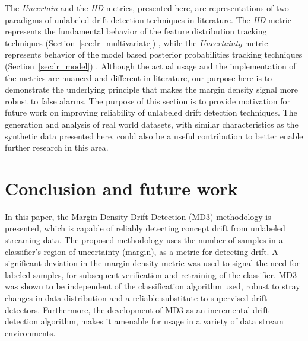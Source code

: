 \documentclass[authoryear,3p,times,twocolumn]{elsarticle}
\begin{document}
The \textit{Uncertain} and the \textit{HD} metrics, presented here, are representations of two paradigms of unlabeled drift detection techniques in literature. The \textit{HD} metric represents the fundamental behavior of the feature distribution tracking techniques (Section~\ref{sec:lr_multivariate}) \citep{lee2012detection,ditzler2011hellinger, kuncheva2014pca,qahtan2015pca}, while the \textit{Uncertainty} metric represents behavior of the model based posterior probabilities tracking techniques (Section~\ref{sec:lr_model}) \citep{dries2009adaptive,lindstrom2013drift,dredze2010we,zliobaite2010change}
. Although the actual usage and the implementation of the metrics are nuanced and different in literature, our purpose here is to demonstrate the underlying principle that makes the margin density signal more robust to false alarms. The purpose of this section is to provide motivation for future work on improving reliability of unlabeled drift detection techniques. The generation and analysis of real world datasets, with similar characteristics as the synthetic data presented here, could also be a useful contribution to better enable further research in this area. 


\section{Conclusion and future work}
\label{sec:conclusion}

In this paper, the Margin Density Drift Detection (MD3) methodology is presented, which is capable of reliably detecting concept drift from unlabeled streaming data. 
The proposed methodology uses the number of samples in a classifier's region of uncertainty (margin), as a metric for detecting drift. A significant deviation in the margin density metric was used to signal the need for labeled samples, for subsequent verification and retraining of the classifier. MD3 was shown to be independent of the classification algorithm used, robust to stray changes in data distribution and a reliable substitute to supervised drift detectors. Furthermore, the development of MD3 as an incremental drift detection algorithm, makes it amenable for usage in a variety of data stream environments. 
\end{document}
